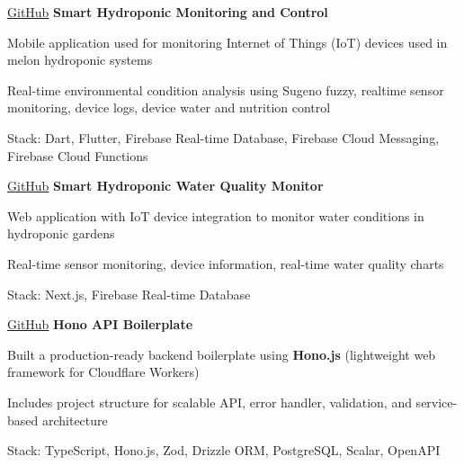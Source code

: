 \vspace{0.3 cm}


\begin{twocolentrylink}{
		\href{https://github.com/masmuss/mobile-hydroponic-monitoring.git}{GitHub}
	}
	\textbf{Smart Hydroponic Monitoring and Control}
\end{twocolentrylink}
\begin{onecolentry}
	\begin{highlights}
		\item Mobile application used for monitoring Internet of Things (IoT) devices used in melon hydroponic systems
		\item Real-time environmental condition analysis using Sugeno fuzzy, realtime sensor monitoring, device logs, device water and nutrition control
		\item Stack: Dart, Flutter, Firebase Real-time Database, Firebase Cloud Messaging, Firebase Cloud Functions
	\end{highlights}
\end{onecolentry}

\vspace{0.3 cm}


\begin{twocolentrylink}{
		\href{https://github.com/masmuss/next-hydroponic-monitoring.git}{GitHub}
	}
	\textbf{Smart Hydroponic Water Quality Monitor}
\end{twocolentrylink}
\begin{onecolentry}
	\begin{highlights}
		\item Web application with IoT device integration to monitor water conditions in hydroponic gardens
		\item Real-time sensor monitoring, device information, real-time water quality charts
		\item Stack: Next.js, Firebase Real-time Database
	\end{highlights}
\end{onecolentry}

\vspace{0.3 cm}


\begin{twocolentrylink}{
		\href{https://github.com/masmuss/hono-api-boilerplate.git}{GitHub}
	}
	\textbf{Hono API Boilerplate}
\end{twocolentrylink}
\begin{onecolentry}
	\begin{highlights}
		\item Built a production-ready backend boilerplate using \textbf{Hono.js} (lightweight web framework for Cloudflare Workers)
		\item Includes project structure for scalable API, error handler, validation, and service-based architecture
		\item Stack: TypeScript, Hono.js, Zod, Drizzle ORM, PostgreSQL, Scalar, OpenAPI
	\end{highlights}
\end{onecolentry}

